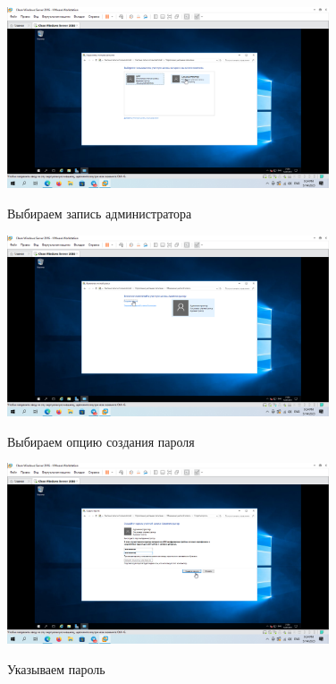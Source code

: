 \documentclass[a4paper]{article}
\begin{document}
  \begin{figure}[H]
    \centering
    \includegraphics[width=0.85\textwidth]{5_0025}
    \label{img:25}
    \caption{Выбираем запись администратора}
  \end{figure}

  \begin{figure}[H]
    \centering
    \includegraphics[width=0.85\textwidth]{5_0026}
    \label{img:26}
    \caption{Выбираем опцию создания пароля}
  \end{figure}

  \begin{figure}[H]
    \centering
    \includegraphics[width=0.85\textwidth]{5_0027}
    \label{img:27}
    \caption{Указываем пароль}
  \end{figure}
\end{document}
